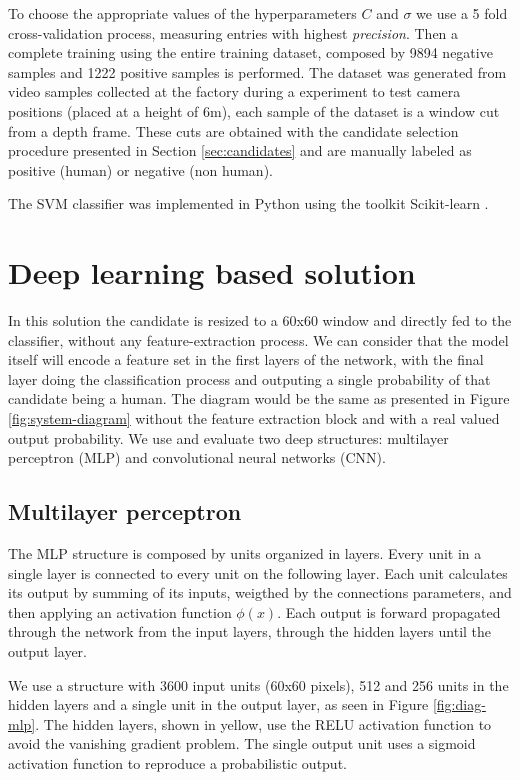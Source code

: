       To choose the appropriate values of the hyperparameters $C$ and $\sigma$ we use a 5 fold cross-validation process, measuring entries with highest \textit{precision}. Then a complete training using the entire training dataset, composed by 9894 negative samples and 1222 positive samples is performed. The dataset was generated from video samples collected at the factory during a experiment to test camera positions (placed at a height of 6m), each sample of the dataset is a window cut from a depth frame. These cuts are obtained with the candidate selection procedure presented in Section \ref{sec:candidates} and are manually labeled as positive (human) or negative (non human).

      The SVM classifier was implemented in Python using the toolkit Scikit-learn \cite{scikit-learn}.


\section{Deep learning based solution}
\label{sec:deep}



    In this solution the candidate is resized to a 60x60 window and directly fed to the classifier, without any feature-extraction process. We can consider that the model itself will encode a feature set in the first layers of the network, with the final layer doing the classification process and outputing a single probability of that candidate being a human. The diagram would be the same as presented in Figure \ref{fig:system-diagram} without the feature extraction block and with a real valued output probability. We use and evaluate two deep structures: multilayer perceptron (MLP) and convolutional neural networks (CNN).

    \subsection{Multilayer perceptron}
        The MLP structure is composed by units organized in layers. Every unit in a single layer is connected to every unit on the following layer. Each unit calculates its output by summing of its inputs, weigthed by the connections parameters, and then applying an activation function $\phi(x)$. Each output is forward propagated through the network from the input layers, through the hidden layers until the output layer.

        We use a structure with 3600 input units (60x60 pixels), 512 and 256 units in the hidden layers and a single unit in the output layer, as seen in Figure \ref{fig:diag-mlp}. The hidden layers, shown in yellow, use the RELU \cite{nair2010relu} activation function to avoid the vanishing gradient problem. The single output unit uses a sigmoid activation function to reproduce a probabilistic output.

